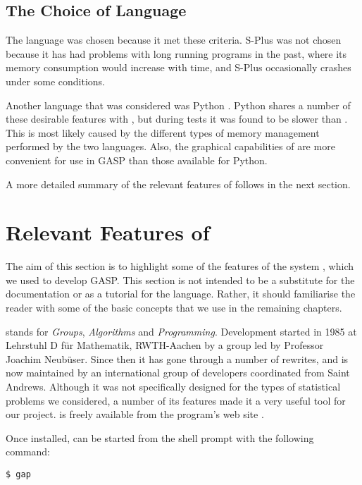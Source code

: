 \subsection{The Choice of Language}

The \GAP{} language was chosen because it met these criteria.  S-Plus
was not chosen because it has had problems with long running
programs in the past, where its memory consumption would increase with
time, and S-Plus occasionally crashes under some conditions.

Another language that was considered was Python \cite{python}.  Python
shares a number of these desirable features with \GAP, but during
tests it was found to be slower than \GAP.  This is most likely caused
by the different types of memory management performed by the two
languages.  Also, the graphical capabilities of \GAP{} are more
convenient for use in GASP than those available for Python.

A more detailed summary of the relevant features of \GAP{} follows in
the next section.


\section{Relevant Features of \GAP}

The aim of this section is to highlight some of the features of the
system \GAP{}, which we used to develop GASP.  This section is not
intended to be a substitute for the \GAP{} documentation or as a
tutorial for the language.  Rather, it should familiarise the reader
with some of the basic concepts that we use in the remaining chapters.

\GAP{} stands for \emph{Groups}, \emph{Algorithms} and
\emph{Programming}.  Development started in 1985 at Lehrstuhl D f\"ur
Mathematik, RWTH-Aachen by a group led by Professor Joachim
Neub\"user.  Since then it has gone through a number of rewrites, and
is now maintained by an international group of developers coordinated
from Saint Andrews.  Although it was not specifically designed for the
types of statistical problems we considered, a number of its features
made it a very useful tool for our project.  \GAP{} is freely
available from the program's web site \cite{gap-www}.

Once installed, \GAP{} can be started from the shell prompt with the
following command:

\begin{verbatim}
$ gap
\end{verbatim}

